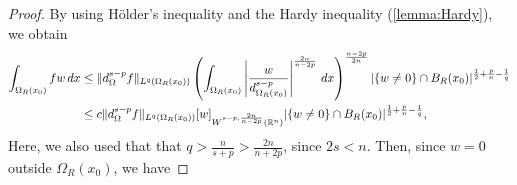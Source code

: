 \documentclass[11pt,reqno]{amsart}
\theoremstyle{plain}
\theoremstyle{definition}
\numberwithin{equation}{section}
\newcommand{\R}{\mathbb{R}}
\newcommand{\1}{\mathbbm{1}}
\renewcommand{\d}{\textnormal{\,d}}
\begin{document}
\begin{proof}
By using H\"older's inequality and the Hardy inequality (\autoref{lemma:Hardy}), we obtain
\begin{align*}
    \int_{\Omega_R(x_0)} fw \d x
&\leq \|d_{\Omega}^{s-p}f\|_{L^q(\Omega_R(x_0))} \left( \int_{\Omega_R(x_0)} \left|\frac{w}{d_{\Omega_R(x_0)}^{s-p}}\right|^{\frac{2n}{n-2p}} \d x \right)^{\frac{n-2p}{2n}} |\{ w \not = 0 \} \cap B_R(x_0)|^{\frac{1}{2}+\frac{p}{n}-\frac{1}{q}} \\
&\leq c \|d_{\Omega}^{s-p}f\|_{L^q(\Omega_R(x_0))} [w]_{W^{s-p, \frac{2n}{n-2p}}(\R^n)}  |\{ w \not = 0 \} \cap B_R(x_0)|^{\frac{1}{2}+\frac{p}{n}-\frac{1}{q}},
\end{align*}
Here, we also used that that $q > \frac{n}{s+p} > \frac{2n}{n+2p}$, since $2s < n$. Then, since $w=0$ outside $\Omega_R(x_0)$, we have

\end{proof}
\end{document}
